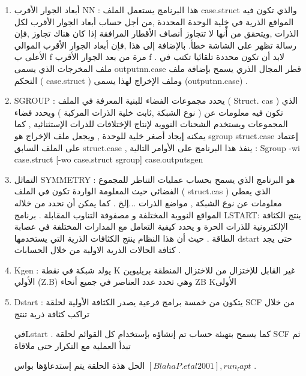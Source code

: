 \begin{enumerate}
	\item 
	أبعاد الجوار الأقرب	NN : هذا البرنامج يستعمل الملف	case.struct
	والذي تكون فيه المواقع الذرية في خلية الوحدة المحددة ,من أجل حساب أبعاد الجوار الأقرب لكل الذرات ,ويتحقق من أّنها لا تتجاوز أنصاف الأقطار المرافقة إذا كان هناك تجاوز ,فإن رسالة تظهر على الشاشة خطأ. بالإضافة إلى هذا ,فإن أبعاد الجوار الأقرب الموالي الأعلى ب f مرة من بعد الجوار الأقرب f . لابد أن تكون محددة تلقائيا تكتب في ملف المخرجات الذي يسمى  outputnn.case قطر المجال الذري يسمح بإضافة ملف التحكم ( case.struct ) وملف الإخراج لهذا يسمى  (outputnn.case) .
	\item 
	SGROUP  :  
	يحدد مجموعات الفضاء للبنية المعرفة في الملف ( Struct. cas ) الذي تكون فيه معلومات عن ( نوع الشبكة ,ثابت خلية الذرات المركبة ) ويحدد فضاء المجموعات ويستخدم الشحنات النووية لإنتاج الإختلافات للذرات الإستثنائية , 
	كما يمكنه إيجاد أصغر خلية للوحدة , ويجعل ملف الإخراج هو sgroup struct.case إعتماد على الملف السابق struct.case , ينفذ هذا البرنامج على الأوامر التالية :
	Sgroup -wi case.struct [-wo case.struct sgroup] case.outputsgen
	\item 
	التماثل SYMMETRY : هو البرنامج الذي يسمح بحساب عمليات التناظر للمجموع الفضائي حيث المعلومة الواردة تكون في الملف ( struct.cas ) الذي يعطي معلومات عن نوع الشبكة , مواضع الذرات ...إلخ . كما يمكن أن نحدد من 
	خلاله المواقع النووية المختلفة و مصفوفة التناوب المقابلة .
	برنامج LSTART:  ينتج الكثافة الإلكترونية للذرات الحرة و يحدد كيفية التعامل مع المدارات المختلفة  في عصابة الطاقة . 
	حيث أن هذا النظام ينتج الكثافات الذرية التي يستخدمها dstart  حتى يجد كثافة الحالات الذرية الاولية من خلال الحسابات .
	\item 
	Kgen : يولد شبكة في نقطة K غير القابل للإختزال من للاختزال المنطقة بريليوين الأولي (Z.B) وهي تحدد عدد العناصر في جميع أنحاء ZB Kالأولى
	\item 
	Dstart : يتكون من خمسة برامج فرعية يصدر الكثافة الأولية لحلقة SCF من خلال تراكب كثافة ذرية تنتج
	
	فيLstart . كما يسمح بتهيئة حساب تم إنشاؤه بإستخدام كل القوائم لحلقة SCF ثم تبدأ العملية مع التكرار حتى ملاقاة
	
	الحل هذة الحلقة يتم إستدعاؤها بواس   $ [Blaha P. et al 2001], run_lapt  $ .

\end{enumerate}

